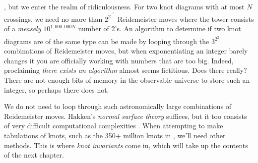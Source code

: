     \cite{CowardLackenbyReidemeisterUpperBound}, but we enter the realm of
    ridiculousness. For two knot diagrams with at most $N$ crossings, we need
    no more than $2^{2^{\cdot^{\cdot^{\cdot^{{2^{N}}}}}}}$ Reidemeister moves
    where the tower consists of a \textit{measely}
    $10^{1,000,000N}$ number of 2's. An algorithm to determine if two knot
    diagrams are of the same type can be made by looping through the
    $3^{2^{2^{\cdot^{\cdot^{\cdot^{{2^{N}}}}}}}}$ combinations of Reidemeister
    moves, but when exponentiating an integer barely changes it
    you are officially working with numbers that are too big. Indeed,
    proclaiming \textit{there exists an algorithm} almost seems fictitious.
    Does there really? There are not enough bits of memory in the observable
    universe to store such an integer, so perhaps there does not.
    \par\hfill\par
    We do not need to loop through such astronomically large combinations of
    Reidemeister moves. Hakken's \textit{normal surface theory} suffices,
    but it too consists of very difficult computational complexities
    \cite{HassAlgorithmsForKnotsAnd3Manifolds}.
    When attempting to make tabulations of knots,
    such as the 350+ million knots in \cite{Burton2020TheN3}, we'll need
    other methods. This is where \textit{knot invariants} come in, which will
    take up the contents of the next chapter.
